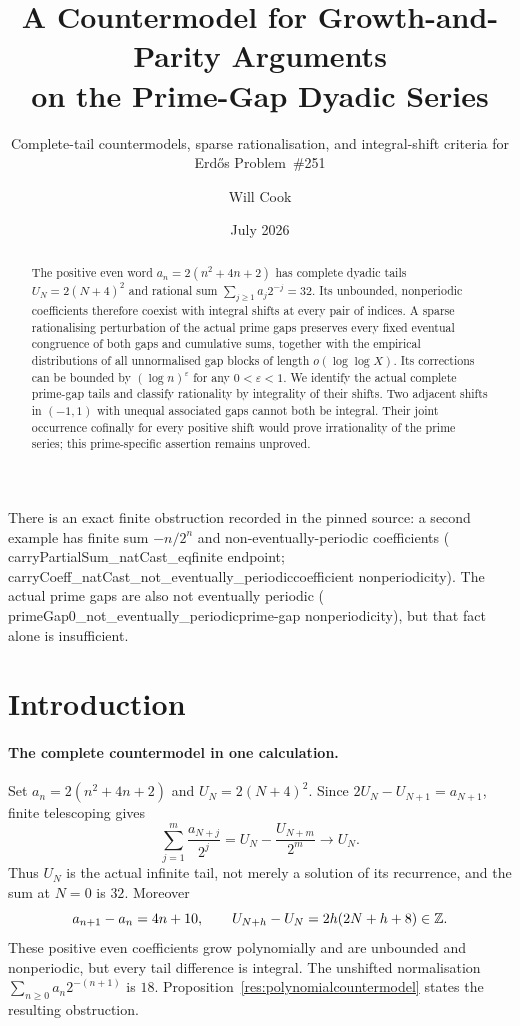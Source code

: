 \documentclass[11pt]{article}
\title{A Countermodel for Growth-and-Parity Arguments\\on the Prime-Gap Dyadic Series}
\subtitle{Complete-tail countermodels, sparse rationalisation,
and integral-shift criteria for Erd\H{o}s Problem~\#251}
\author{Will Cook}
\date{July 2026}
\begin{document}
\maketitle
\noteprovenance

\begin{abstract}
The positive even word $a_n=2(n^2+4n+2)$ has complete dyadic tails
$U_N=2(N+4)^2$ and rational sum $\sum_{j\ge1}a_j2^{-j}=32$.
Its unbounded, nonperiodic coefficients therefore coexist with integral
shifts at every pair of indices.  A sparse rationalising perturbation of the
actual prime gaps preserves every fixed eventual congruence of both gaps
and cumulative sums, together with the empirical distributions of all
unnormalised gap blocks of length $o(\log\log X)$.  Its corrections can be
bounded by $(\log n)^\varepsilon$ for any $0<\varepsilon<1$.
We identify the actual complete prime-gap tails and classify rationality by
integrality of their shifts.  Two adjacent shifts in $(-1,1)$ with unequal
associated gaps cannot both be integral.  Their joint occurrence cofinally
for every positive shift would prove irrationality of the prime series;
this prime-specific assertion remains unproved.
\end{abstract}

There is an exact finite obstruction recorded in the pinned source: a second
example has finite sum $-n/2^n$ and non-eventually-periodic coefficients
(
      {carryPartialSum_natCast_eq}{finite endpoint};
      {carryCoeff_natCast_not_eventually_periodic}{coefficient nonperiodicity}).
The actual prime gaps are also not eventually periodic
(
      {primeGap0_not_eventually_periodic}{prime-gap nonperiodicity}),
but that fact alone is insufficient.

\section{Introduction}\label{sec:problem}

\paragraph{The complete countermodel in one calculation.}
Set $a_n=2(n^2+4n+2)$ and $U_N=2(N+4)^2$.  Since
$2U_N-U_{N+1}=a_{N+1}$, finite telescoping gives
\[
 \sum_{j=1}^{m}\frac{a_{N+j}}{2^j}
   =U_N-\frac{U_{N+m}}{2^m}\longrightarrow U_N.
\]
Thus $U_N$ is the actual infinite tail, not merely a solution of its
recurrence, and the sum at $N=0$ is $32$.  Moreover
\[
 a_{n+1}-a_n=4n+10,\qquad
 U_{N+h}-U_N=2h(2N+h+8)\in\mathbb{Z}.
\]
These positive even coefficients grow polynomially and are unbounded and
nonperiodic, but every tail difference is integral.  The unshifted
normalisation $\sum_{n\ge0}a_n2^{-(n+1)}$ is $18$.
Proposition~\ref{res:polynomialcountermodel} states the resulting obstruction.
\end{document}
